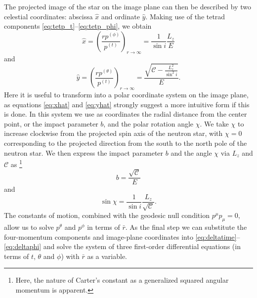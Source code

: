 \documentclass{aa}
\newcommand{\be}{\begin{equation}}
\newcommand{\ee}{\end{equation}}
\newcommand{\Ca}{\ensuremath{\mathcal{C}}}
\newcommand{\rb}{\ensuremath{\bar{r}}}
\begin{document}
The projected image of the star on the image plane can then be described by two celestial coordinates:
abscissa $\hat{x}$ and ordinate $\hat{y}$.
Making use of the tetrad components \eqref{eq:tetp_t}--\eqref{eq:tetp_phi}, we obtain \citep[][p.347]{cha}
\be\label{eq:xhat}
\hat{x} = \left( \frac{rp^{(\phi)}}{p^{(t)}} \right)_{r \rightarrow \infty} = \frac{1}{\sin i} \frac{L_z}{E}
\ee
and
\be\label{eq:yhat}
\hat{y} = \left( \frac{rp^{(\theta)}}{p^{(t)}} \right)_{r \rightarrow \infty} = \frac{\sqrt{\Ca - \frac{L_z^2}{\sin^2 i}}}{E}.
\ee
Here it is useful to transform into a polar coordinate system on the image plane, as equations \eqref{eq:xhat} and \eqref{eq:yhat} strongly suggest a more intuitive form if this is done. 
In this system we use as coordinates the radial distance from the center point, or the impact parameter $b$, and the polar rotation angle $\chi$.  
We take $\chi$ to increase clockwise from the projected spin axis of the neutron star, with $\chi=0$ corresponding to the projected direction from the south to the north pole of the neutron star.  
We then express the impact parameter $b$ and the angle $\chi$ via $L_z$ and $\Ca$ as%
\footnote{
    Here, the nature of Carter's constant as a generalized squared
    angular momentum is apparent.
}
\be
b = \frac{\sqrt{\Ca}}{E}
\ee
and
\be
\sin \chi = \frac{1}{\sin i} \frac{L_z}{\sqrt{\Ca}}.
\ee
The constants of motion, combined with the geodesic null condition $p^\mu p_\mu = 0$, allow us to solve $p^\theta$ and $p^\phi$ in terms of $\rb$.
As the final step we can substitute the four-momentum components and image-plane coordinates into \eqref{eq:deltatime}--\eqref{eq:deltaphi} and solve the system of three first-order differential equations (in terms of $t$, $\theta$ and $\phi$) with $\rb$ as a variable.
\end{document}

